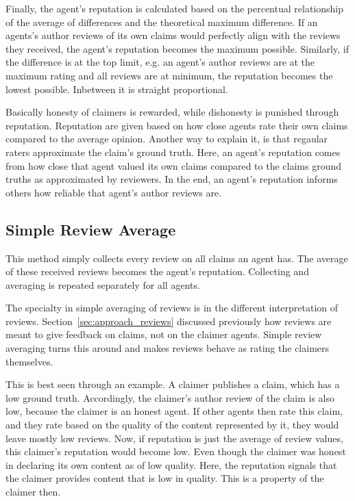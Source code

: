 \documentclass[%
    ]{\PathToTumTemplate/thesis/tum_thesis}
\begin{document}
Finally, the agent's reputation is calculated based on the percentual relationship of the average of differences and the theoretical maximum difference.
If an agents's author reviews of its own claims would perfectly align with the reviews they received, the agent's reputation becomes the maximum possible.
Similarly, if the difference is at the top limit, e.g. an agent's author reviews are at the maximum rating and all reviews are at minimum, the reputation becomes the lowest possible.
Inbetween it is straight proportional.

Basically honesty of claimers is rewarded, while dishonesty is punished through reputation.
Reputation are given based on how close agents rate their own claims compared to the average opinion.
Another way to explain it, is that regaular raters approximate the claim's ground truth.
Here, an agent's reputation comes from how close that agent valued its own claims compared to the claims ground truths as approximated by reviewers.
In the end, an agent's reputation informs others how reliable that agent's author reviews are.


\subsection{Simple Review Average}
This method simply collects every review on all claims an agent has.
The average of these received reviews becomes the agent's reputation.
Collecting and averaging is repeated separately for all agents.

The specialty in simple averaging of reviews is in the different interpretation of reviews.
Section~\ref{sec:approach_reviews} discussed previously how reviews are meant to give feedback on claims, not on the claimer agents.
Simple review averaging turns this around and makes reviews behave as rating the claimers themselves.

This is best seen through an example.
A claimer publishes a claim, which has a low ground truth.
Accordingly, the claimer's author review of the claim is also low, because the claimer is an honest agent.
If other agents then rate this claim, and they rate based on the quality of the content represented by it, they would leave mostly low reviews.
Now, if reputation is just the average of review values, this claimer's reputation would become low.
Even though the claimer was honest in declaring its own content as of low quality.
Here, the reputation signals that the claimer provides content that is low in quality.
This is a property of the claimer then.
\end{document}
